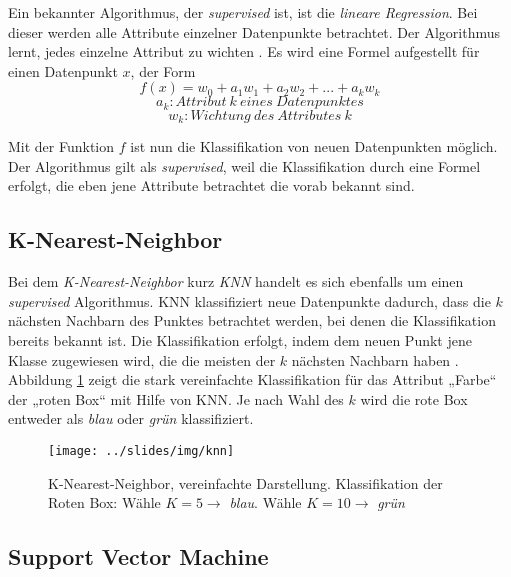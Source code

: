 Ein bekannter Algorithmus, der \textit{supervised} ist, ist die \textit{lineare Regression}. Bei dieser werden alle Attribute einzelner Datenpunkte betrachtet. Der Algorithmus lernt, jedes einzelne Attribut zu wichten \cite{datamining2011}. Es wird eine Formel aufgestellt für einen Datenpunkt $x$, der Form
\[
	f(x) = w_0 + a_1w_1 + a_2w_2 + ... + a_kw_k
\]
\[
	a_k : Attribut\ k\ eines\ Datenpunktes
\]
\[
	w_k : Wichtung\ des\ Attributes\ k
\]

Mit der Funktion $f$ ist nun die Klassifikation von neuen Datenpunkten möglich. Der Algorithmus gilt als \textit{supervised}, weil die Klassifikation durch eine Formel erfolgt, die eben jene Attribute betrachtet die vorab bekannt sind.

\subsection{K-Nearest-Neighbor}

Bei dem \textit{K-Nearest-Neighbor} kurz \textit{KNN} handelt es sich ebenfalls um einen \textit{supervised} Algorithmus. KNN klassifiziert neue Datenpunkte dadurch, dass die $k$ nächsten Nachbarn des Punktes betrachtet werden, bei denen die Klassifikation bereits bekannt ist. Die Klassifikation erfolgt, indem dem neuen Punkt jene Klasse zugewiesen wird, die die meisten der $k$ nächsten Nachbarn haben \cite{datamining2011}. Abbildung \ref{fig:knn} zeigt die stark vereinfachte Klassifikation für das Attribut „Farbe“ der „roten Box“ mit Hilfe von KNN. Je nach Wahl des $k$ wird die rote Box entweder als \textit{blau} oder \textit{grün} klassifiziert.

\begin{figure}[h]
    \centering
    \texttt{[image: ../slides/img/knn]}
    \caption{K-Nearest-Neighbor, vereinfachte Darstellung. Klassifikation der Roten Box: Wähle $K=5 \rightarrow$ \textit{blau}. Wähle $K=10 \rightarrow$ \textit{grün}\label{fig:knn}}
\end{figure}

\subsection{Support Vector Machine}

